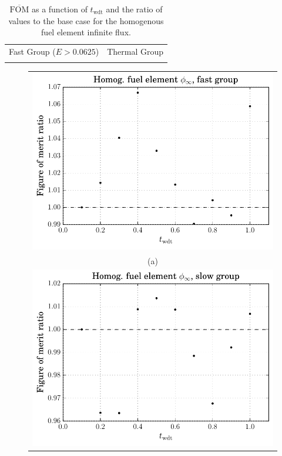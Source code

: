 \begin{table}[hbtp]
  \centering
  \caption[$\overline{\mathrm{FOM}}$ and ratio for
    the homogenous fuel element infinite flux.]{$\overline{\mathrm{FOM}}$ as a function of
    $t_{\mathrm{wdt}}$ and the ratio of values to the base case for
    the homogenous fuel element infinite flux.}
  \begin{tabular}{cc} Fast Group ($E > 0.0625$) & Thermal Group \\
    
 &
   
  \end{tabular}
\label{tab:homog_inf_flx}
\end{table}
\begin{figure}[hbtp]
  \centering
  \begin{tabular}{c}
  \includegraphics[scale=0.9]{images/results/homog_inf_flx_grp_comb1} \\
    (a) \\
  \includegraphics[scale=0.9]{images/results/homog_inf_flx_grp_comb2} \\

\end{tabular}
\end{figure}
